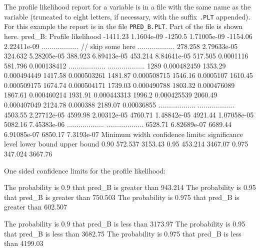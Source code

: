 \documentclass[12pt]{book}
\begin{document}
The profile likelihood report for a variable is in a file
with the same name as the variable (truncated to eight letters,
if necessary, with the suffix {\tt .PLT} appended). For this example
the report is in the file {\tt PRED\_B.PLT}. Part of the file is shown here.  
\beginexample
pred_B:
Profile likelihood
 -1411.23 1.1604e-09
 -1250.5 1.71005e-09
 -1154.06 2.22411e-09
  ...................      // skip some here
  ...................
 278.258 2.79633e-05
 324.632 5.28205e-05
 388.923 6.89413e-05
 453.214 8.84641e-05
 517.505 0.0001116
 581.796 0.000138412
  ...................
  ...................
 1289 0.000482459
 1353.29 0.000494449
 1417.58 0.000503261
 1481.87 0.000508715
 1546.16 0.0005107
 1610.45 0.000509175
 1674.74 0.000504171
 1739.03 0.000490788
 1803.32 0.000476089
 1867.61 0.000460214
 1931.91 0.000443313
 1996.2 0.000425539
 2060.49 0.000407049
 2124.78 0.000388
 2189.07 0.00036855
  ...................
  ...................
 4503.55 2.27712e-05
 4599.98 2.00312e-05
 4760.71 1.48842e-05
 4921.44 1.07058e-05
 5082.16 7.45383e-06
  ...................
  ...................
 6528.71 6.82689e-07
 6689.44 6.91085e-07
 6850.17 7.3193e-07
Minimum width confidence limits:
        significance level  lower bound  upper bound
               0.90             572.537     3153.43
               0.95             453.214     3467.07
               0.975            347.024     3667.76

One sided confidence limits for the profile likelihood:

The probability is     0.9 that pred_B is greater than 943.214
The probability is    0.95 that pred_B is greater than 750.503
The probability is   0.975 that pred_B is greater than 602.507

The probability is     0.9 that pred_B is less than 3173.97
The probability is    0.95 that pred_B is less than 3682.75
The probability is   0.975 that pred_B is less than 4199.03
\endexample
\end{document}
